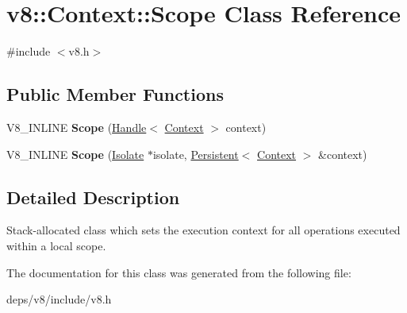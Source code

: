 \hypertarget{classv8_1_1_context_1_1_scope}{}\section{v8\+:\+:Context\+:\+:Scope Class Reference}
\label{classv8_1_1_context_1_1_scope}


{\ttfamily \#include $<$v8.\+h$>$}

\subsection*{Public Member Functions}
\begin{DoxyCompactItemize}
\item 
\hypertarget{classv8_1_1_context_1_1_scope_a171c1cb92354b52c8b1764e88b9540c8}{}V8\+\_\+\+I\+N\+L\+I\+N\+E {\bfseries Scope} (\hyperlink{classv8_1_1_handle}{Handle}$<$ \hyperlink{classv8_1_1_context}{Context} $>$ context)\label{classv8_1_1_context_1_1_scope_a171c1cb92354b52c8b1764e88b9540c8}

\item 
\hypertarget{classv8_1_1_context_1_1_scope_ad5435332c5824226b0c16548dc3745bd}{}V8\+\_\+\+I\+N\+L\+I\+N\+E {\bfseries Scope} (\hyperlink{classv8_1_1_isolate}{Isolate} $\ast$isolate, \hyperlink{classv8_1_1_persistent}{Persistent}$<$ \hyperlink{classv8_1_1_context}{Context} $>$ \&context)\label{classv8_1_1_context_1_1_scope_ad5435332c5824226b0c16548dc3745bd}

\end{DoxyCompactItemize}


\subsection{Detailed Description}
Stack-\/allocated class which sets the execution context for all operations executed within a local scope. 

The documentation for this class was generated from the following file\+:\begin{DoxyCompactItemize}
\item 
deps/v8/include/v8.\+h\end{DoxyCompactItemize}
